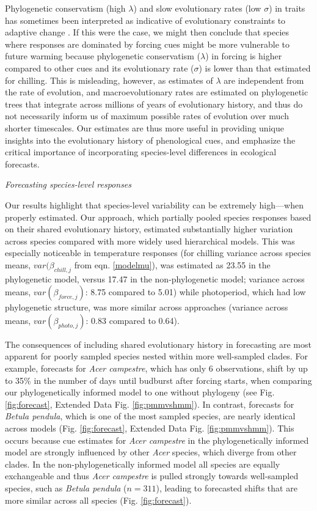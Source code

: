 \documentclass{article}
\begin{document}
Phylogenetic conservatism (high $\lambda$) and slow evolutionary rates (low $\sigma$) in traits has sometimes been interpreted as indicative of evolutionary constraints to adaptive change \citep{wiens2010niche,bennett2021evolution}. If this were the case, we might then conclude that species where responses are dominated by forcing cues might be more vulnerable to future warming because phylogenetic conservatism ($\lambda$) in forcing is higher compared to other cues and its evolutionary rate ($\sigma$) is lower than that estimated for chilling. This is misleading, however, as estimates of $\lambda$ are independent from the rate of evolution, and macroevolutionary rates are estimated on phylogenetic trees that integrate across millions of years of evolutionary history, and thus do not necessarily inform us of maximum possible rates of evolution over much shorter timescales. Our estimates are thus more useful in providing unique insights into the evolutionary history of phenological cues, and emphasize the critical importance of incorporating species-level differences in ecological forecasts.


\emph{Forecasting species-level responses}

Our results highlight that species-level variability can be extremely high---when properly estimated. Our approach, which partially pooled species responses based on their shared evolutionary history, estimated substantially higher variation across species compared with more widely used hierarchical models. This was especially noticeable in temperature responses (for chilling variance across species means, $var(\beta_{chill,j}$ from eqn. \ref{modelmu}), was estimated as 23.55 in the phylogenetic model, versus 17.47 in the non-phylogenetic model; variance across means, $var(\beta_{force,j})$: 8.75 compared to 5.01) while photoperiod, which had low phylogenetic structure, was more similar across approaches (variance across means, $var(\beta_{photo,j})$: 0.83 compared to 0.64). 

The consequences of including shared evolutionary history in forecasting are most apparent for poorly sampled species nested within more well-sampled clades. For example, forecasts for \emph{Acer campestre}, which has only 6 observations, shift by up to 35\% in the number of days until budburst after forcing starts, when comparing our phylogenetically informed model to one without phylogeny (see Fig. \ref{fig:forecast}, Extended Data Fig. \ref{fig:pmmvshmm}). In contrast, forecasts for \emph{Betula pendula}, which is one of the most sampled species, are nearly identical across models (Fig. \ref{fig:forecast}, Extended Data Fig. \ref{fig:pmmvshmm}). This occurs because cue estimates for \emph{Acer campestre} in the phylogenetically informed model are strongly influenced by other \emph{Acer} species, which diverge from other clades. In the non-phylogenetically informed model all species are equally exchangeable and thus \emph{Acer campestre} is pulled strongly towards well-sampled species, such as \emph{Betula pendula} ($n = 311$), leading to forecasted shifts that are more similar across all species (Fig. \ref{fig:forecast}). 
\end{document}
